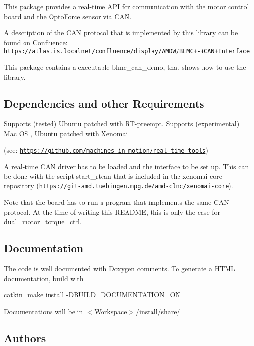 This package provides a real-\/time A\+PI for communication with the motor control board and the Opto\+Force sensor via C\+AN.

A description of the C\+AN protocol that is implemented by this library can be found on Confluence\+: \href{https://atlas.is.localnet/confluence/display/AMDW/BLMC+-+CAN+Interface}{\tt https\+://atlas.\+is.\+localnet/confluence/display/\+A\+M\+D\+W/\+B\+L\+M\+C+-\/+\+C\+A\+N+\+Interface}

This package contains a executable blmc\+\_\+can\+\_\+demo, that shows how to use the library.

\subsection*{Dependencies and other Requirements }

Supports (tested) Ubuntu patched with R\+T-\/preempt. Supports (experimental) Mac OS , Ubuntu patched with Xenomai

(see\+: \href{https://github.com/machines-in-motion/real_time_tools}{\tt https\+://github.\+com/machines-\/in-\/motion/real\+\_\+time\+\_\+tools})

A real-\/time C\+AN driver has to be loaded and the interface to be set up. This can be done with the script {\ttfamily start\+\_\+rtcan} that is included in the xenomai-\/core repository (\href{https://git-amd.tuebingen.mpg.de/amd-clmc/xenomai-core}{\tt https\+://git-\/amd.\+tuebingen.\+mpg.\+de/amd-\/clmc/xenomai-\/core}).

Note that the board has to run a program that implements the same C\+AN protocol. At the time of writing this R\+E\+A\+D\+ME, this is only the case for dual\+\_\+motor\+\_\+torque\+\_\+ctrl.

\subsection*{Documentation }

The code is well documented with Doxygen comments. To generate a H\+T\+ML documentation, build with \begin{DoxyVerb}catkin_make install -DBUILD_DOCUMENTATION=ON
\end{DoxyVerb}


Documentations will be in $<$\+Workspace$>$/install/share/

\subsection*{Authors }


